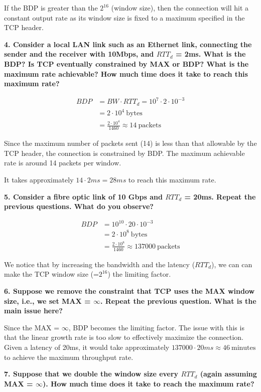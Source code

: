 \documentclass[]{article}
\newcommand{\e}{&=}
\begin{document}
If the BDP is greater than the $2^{16}$ (window size), then the connection will hit a constant output rate as its window size is fixed to a maximum specified in the TCP header.

\textbf{4. Consider a local LAN link such as an Ethernet link, connecting the sender and the receiver with 10Mbps, and $RTT_d$ = 2ms. What is the BDP? Is TCP eventually constrained by MAX or BDP? What is the maximum rate achievable? How much time does it take to reach this maximum rate?}

\begin{align*}
BDP \e BW \cdot RTT_d = 10^7 \cdot 2 \cdot 10^{-3} \\
	\e 2 \cdot 10^4\ \text{bytes} \\
	\e \frac{2 \cdot 10^4}{1460} \approx 14\ \text{packets}
\end{align*}

Since the maximum number of packets sent (14) is less than that allowable by the TCP header, the connection is constrained by BDP. The maximum achievable rate is around 14 packets per window. 

It takes approximately $14 \cdot 2ms = 28ms$ to reach this maximum rate.

\textbf{5. Consider a fibre optic link of 10 Gbps and $RTT_d$ = 20ms. Repeat the previous questions.	What do you observe?}

\begin{align*}
BDP \e 10^{10} \cdot 20\cdot 10^{-3} \\
	\e 2 \cdot 10^8\ \text{bytes}\\
	\e \frac{2 \cdot 10^8}{1460} \approx 137000\ \text{packets}
\end{align*}

We notice that by increasing the bandwidth and the latency ($RTT_d$), we can can make the TCP window size (=$2^{16}$) the limiting factor. 

\textbf{6. Suppose we remove the constraint that TCP uses the MAX window size, i.e., we set MAX = $\infty$. Repeat the previous question. What is the main issue here?}

Since the MAX = $\infty$, BDP becomes the limiting factor. The issue with this is that the linear growth rate is too slow to effectively maximize the connection. Given a latency of 20ms, it would take approximately $137000 \cdot 20ms \approx 46\ \text{minutes}$ to achieve the maximum throughput rate. 

\textbf{7. Suppose that we double the window size every $RTT_d$	(again assuming MAX = $\infty$). How much time does it take to reach the maximum rate?}
\end{document}
